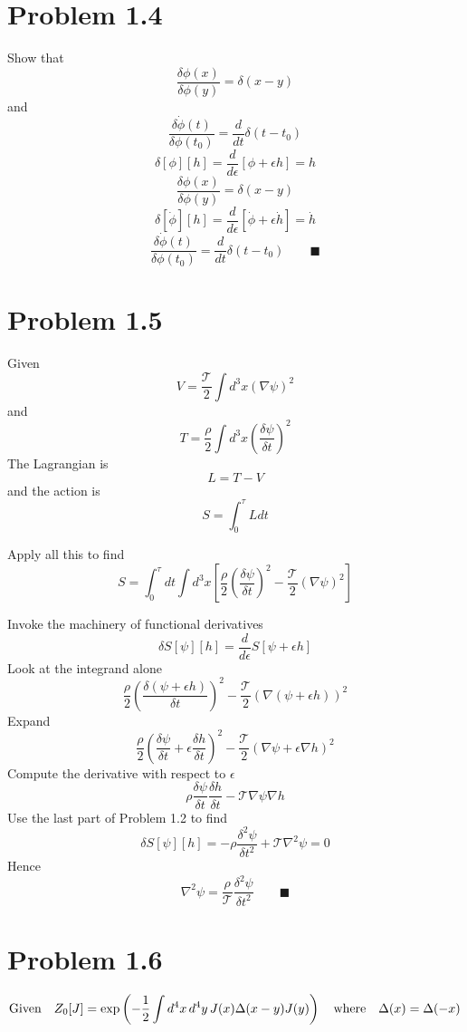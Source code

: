 \documentclass{memoir}
\begin{document}
\section*{Problem 1.4}
Show that \[\frac{\delta\phi(x)}{\delta\phi(y)}=\delta(x-y)\]
and \[\frac{\delta\dot{\phi}(t)}{\delta\phi(t_0)}=\frac{d}{dt}\delta(t-t_0)\]
\[\delta[\phi][h]=\frac{d}{d\epsilon}\left[\phi+\epsilon h\right]=h\]
\[\frac{\delta\phi(x)}{\delta\phi(y)}=\delta(x-y)\]
\[\delta[\dot{\phi}][h]=\frac{d}{d\epsilon}\left[\dot{\phi}+\epsilon \dot{h}\right]=\dot{h}\]
\[\frac{\delta\dot{\phi}(t)}{\delta\phi(t_0)}=\frac{d}{dt}\delta(t-t_0) \qquad \blacksquare\]


\section*{Problem 1.5}
Given \[V=\frac{\mathcal{T}}{2}\int d^3 x(\nabla\psi)^2\]
and \[T=\frac{\rho}{2}\int d^3 x\left(\frac{\delta \psi}{\delta t}\right)^2\]
The Lagrangian is \[L=T-V\] and the action is \[S=\int_0^\tau Ldt\]

Apply all this to find
\[S=\int_0^\tau dt \int d^3 x\left[\frac{\rho}{2}\left(\frac{\delta \psi}{\delta t}\right)^2 - \frac{\mathcal{T}}{2}(\nabla\psi)^2 \right]\]

Invoke the machinery of functional derivatives
\[\delta S[\psi][h]=\frac{d}{d\epsilon}S[\psi+\epsilon h]\]
Look at the integrand alone
\[\frac{\rho}{2}\left(\frac{\delta (\psi+\epsilon h)}{\delta t}\right)^2 - \frac{\mathcal{T}}{2}\left(\nabla(\psi+\epsilon h)\right)^2\]
Expand
\[\frac{\rho}{2}\left(\frac{\delta \psi}{\delta t}+\epsilon \frac{\delta h}{\delta t}\right)^2 - \frac{\mathcal{T}}{2}\left(\nabla \psi+\epsilon \nabla h\right)^2\]
Compute the derivative with respect to $\epsilon$
\[\rho\frac{\delta \psi}{\delta t}\frac{\delta h}{\delta t} - \mathcal{T}\nabla \psi \nabla h\]
Use the last part of Problem 1.2 to find
\[\delta S[\psi][h]=-\rho\frac{\delta^2 \psi}{\delta t^2} + \mathcal{T}\nabla^2 \psi =0\]
Hence
\[\nabla^2 \psi=\frac{\rho}{\mathcal{T}}\frac{\delta^2 \psi}{\delta t^2} \qquad \blacksquare\]

\section*{Problem 1.6}
\[\qq*{Given}Z_0[J]=\exp\left(-\frac{1}{2}\int d^4 x\, d^4 y\, J(x) \Delta(x-y) J(y)\right)\qq{where}\Delta(x)=\Delta(-x)\]
\end{document}
